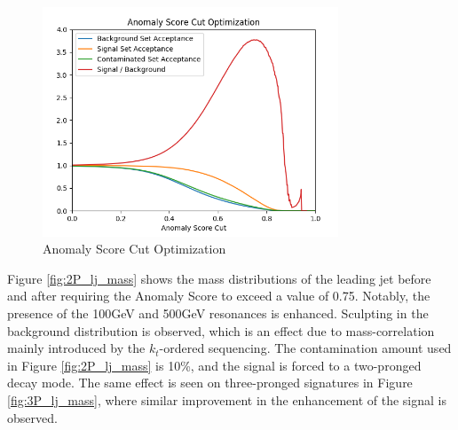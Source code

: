 \documentclass[12pt, a4paper]{article}
\begin{document}
\begin{figure}[H]
	\begin{center}
		\includegraphics[width=250pt]{imgs/Score_Opt.png}
	\end{center}
	\caption{Anomaly Score Cut Optimization}
	\label{fig:aucs_vs_contam}
\end{figure}

Figure \ref{fig:2P_lj_mass} shows the mass distributions of the leading jet before and after requiring the Anomaly Score to exceed a value of 0.75. Notably, the presence of the 100GeV and 500GeV resonances is enhanced. Sculpting in the background distribution is observed, which is an effect due to mass-correlation mainly introduced by the $k_{t}$-ordered sequencing. The contamination amount used in Figure \ref{fig:2P_lj_mass} is 10\%, and the signal is forced to a two-pronged decay mode. The same effect is seen on three-pronged signatures in Figure \ref{fig:3P_lj_mass}, where similar improvement in the enhancement of the signal is observed. 
\end{document}
